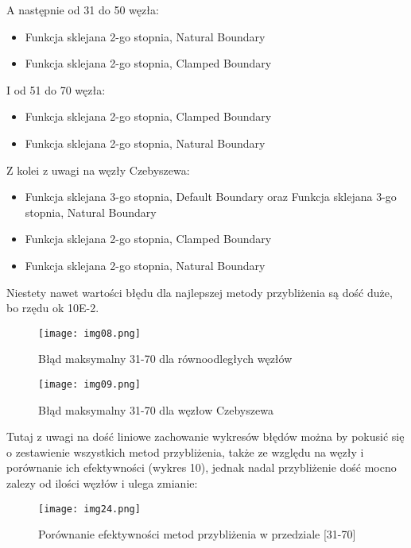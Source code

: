 \documentclass{article}
\begin{document}
A następnie od 31 do 50 węzła:
\begin{itemize}
\item Funkcja sklejana 2-go stopnia, Natural Boundary
\item Funkcja sklejana 2-go stopnia, Clamped Boundary
\end{itemize}

I od 51 do 70 węzła:
\begin{itemize}
\item Funkcja sklejana 2-go stopnia, Clamped Boundary
\item Funkcja sklejana 2-go stopnia, Natural Boundary
\end{itemize}
\bigbreak

Z kolei z uwagi na węzły Czebyszewa:

\begin{itemize}
\item Funkcja sklejana 3-go stopnia, Default Boundary oraz Funkcja sklejana 3-go stopnia, Natural Boundary
\item Funkcja sklejana 2-go stopnia, Clamped Boundary
\item Funkcja sklejana 2-go stopnia, Natural Boundary
\end{itemize}

\noindent
Niestety nawet wartości błędu dla najlepszej metody przybliżenia są dość duże, bo rzędu ok 10E-2.

\begin{figure}[H]
  \begin{minipage}[b]{0.49\textwidth}
    \texttt{[image: img08.png]}
    \caption{Błąd maksymalny 31-70 dla równoodległych węzłów}
  \end{minipage}
  \hfill
  \begin{minipage}[b]{0.49\textwidth}
    \texttt{[image: img09.png]}
    \caption{Błąd maksymalny 31-70 dla węzłow Czebyszewa}
  \end{minipage}
\end{figure}

\noindent Tutaj z uwagi na dość liniowe zachowanie wykresów błędów można by pokusić się o zestawienie wszystkich metod przybliżenia, także ze względu na węzły i porównanie ich efektywności (wykres 10), jednak nadal przybliżenie dość mocno zalezy od ilości węzłów i ulega zmianie:

\begin{figure}[H]
  \centering
  \begin{minipage}[b]{0.93\textwidth}
    \texttt{[image: img24.png]}
    \caption{Porównanie efektywności metod przybliżenia w przedziale [31-70]}
  \end{minipage}
\end{figure}
\end{document}
